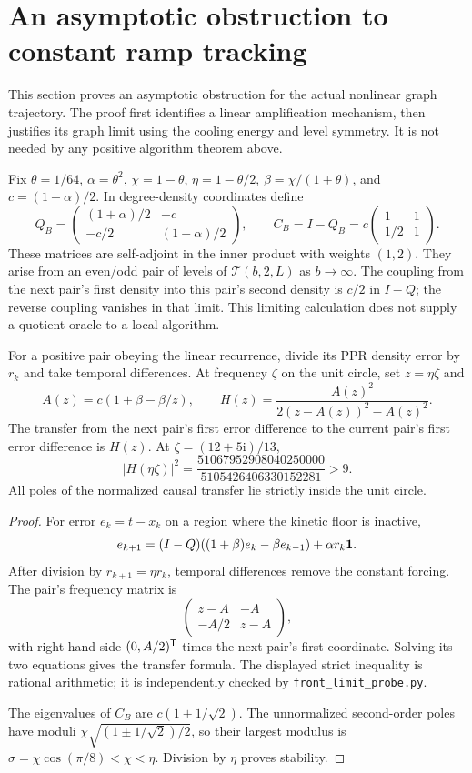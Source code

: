 \section{An asymptotic obstruction to constant ramp tracking}
\label{sec:revisit-ramp-asymptotic}
This section proves an asymptotic obstruction for the actual nonlinear
graph trajectory. The proof first identifies a linear amplification
mechanism, then justifies its graph limit using the cooling energy and
level symmetry. It is not needed by any positive algorithm theorem above.

Fix $\theta=1/64$, $\alpha=\theta^2$, $\chi=1-\theta$,
$\eta=1-\theta/2$, $\beta=\chi/(1+\theta)$, and
$c=(1-\alpha)/2$. In degree-density coordinates define
\[
 Q_B=\begin{pmatrix}(1+\alpha)/2&-c\\-c/2&(1+\alpha)/2\end{pmatrix},
 \qquad C_B=I-Q_B=c\begin{pmatrix}1&1\\1/2&1\end{pmatrix}.
\]
These matrices are self-adjoint in the inner product with weights $(1,2)$.
They arise from an even/odd pair of levels of $\mathcal T(b,2,L)$ as
$b\to\infty$. The coupling from the next pair's first density into this
pair's second density is $c/2$ in $I-Q$; the reverse coupling vanishes
in that limit. This limiting calculation does not supply a quotient oracle
to a local algorithm.

\begin{lemma}
\label{lem:revisit-pair-gain}
For a positive pair obeying the linear recurrence, divide its PPR density
error by $r_k$ and take temporal differences. At frequency $\zeta$ on
the unit circle, set $z=\eta\zeta$ and
\[
 A(z)=c(1+\beta-\beta/z),\qquad
 H(z)=\frac{A(z)^2}{2(z-A(z))^2-A(z)^2}.
\]
The transfer from the next pair's first error difference to the current
pair's first error difference is $H(z)$. At $\zeta=(12+5\mathrm i)/13$,
\[
 |H(\eta\zeta)|^2
 =\frac{51067952908040250000}{5105426406330152281}>9.
\]
All poles of the normalized causal transfer lie strictly inside the unit
circle.
\end{lemma}
\begin{proof}
For error $e_k=t-x_k$ on a region where the kinetic floor is inactive,
\[
 e_{k+1}=(I-Q)((1+\beta)e_k-\beta e_{k-1})+\alpha r_k\mathbf{1}.
\]
After division by $r_{k+1}=\eta r_k$, temporal differences remove the
constant forcing. The pair's frequency matrix is
\[
 \begin{pmatrix}z-A&-A\\-A/2&z-A\end{pmatrix},
\]
with right-hand side $(0,A/2)^{\mathsf{T}}$ times the next pair's first
coordinate. Solving its two equations gives the transfer formula.
The displayed strict inequality is rational arithmetic; it is independently
checked by \texttt{front\_limit\_probe.py}.

The eigenvalues of $C_B$ are $c(1\pm1/\sqrt2)$. The unnormalized
second-order poles have moduli
$\chi\sqrt{(1\pm1/\sqrt2)/2}$, so their largest modulus is
$\sigma=\chi\cos(\pi/8)<\chi<\eta$. Division by $\eta$ proves stability.
\end{proof}

